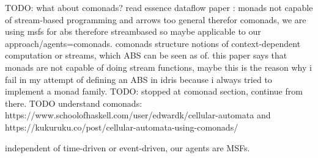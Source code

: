TODO: what about comonads? read essence dataflow paper \cite{uustalu_essence_2006}: monads not capable of stream-based programming and arrows too general therefor comonads, we are using msfs for abs therefore streambased so maybe applicable to our approach/agents=comonads. comonads structure notions of context-dependent computation or streams, which ABS can be seen as of. this paper says that monads are not capable of doing stream functions, maybe this is the reason why i fail in my attempt of defining an ABS in idris because i always tried to implement a monad family. TODO: stopped at comonad section, continue from there. TODO understand comonads: https://www.schoolofhaskell.com/user/edwardk/cellular-automata and https://kukuruku.co/post/cellular-automata-using-comonads/

independent of time-driven or event-driven, our agents are MSFs.